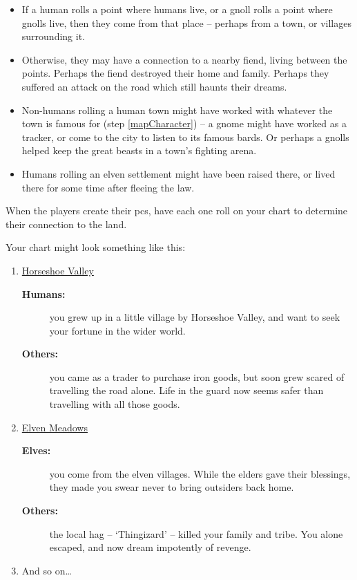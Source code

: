 \begin{multicols}{2}
\begin{itemize}
  \item
  If a human rolls a point where humans live, or a gnoll rolls a point where gnolls live, then they come from that place -- perhaps from a town, or villages surrounding it.
  \item
  Otherwise, they may have a connection to a nearby fiend, living between the points.
  Perhaps the fiend destroyed their home and family.
  Perhaps they suffered an attack on the road which still haunts their dreams.
  \item
  Non-humans rolling a human town might have worked with whatever the town is famous for (step \ref{mapCharacter}) -- a gnome might have worked as a tracker, or come to the city to listen to its famous bards.
  Or perhaps a gnolls helped keep the great beasts in a town's fighting arena.
  \item
  Humans rolling an elven settlement might have been raised there, or lived there for some time after fleeing the law.
\end{itemize}

When the players create their \glspl{pc}, have each one roll on your chart to determine their connection to the land.

\needspace{8em}
Your chart might look something like this:
\begin{enumerate}
  \item
  \underline{Horseshoe Valley}
  \begin{description}
    \item[\textbf{Humans:}] you grew up in a little village by Horseshoe Valley, and want to seek your fortune in the wider world.
    \item[\textbf{Others:}] you came as a trader to purchase iron goods, but soon grew scared of travelling the road alone.
    Life in the \gls{guard} now seems safer than travelling with all those goods.
  \end{description}
  \item
  \underline{Elven Meadows}
  \begin{description}
    \item[\textbf{Elves:}]
    you come from the elven villages.
    While the elders gave their blessings, they made you swear never to bring outsiders back home.
    \item[\textbf{Others:}]
    the local hag -- `Thingizard' -- killed your family and tribe.
    You alone escaped, and now dream impotently of revenge.
  \end{description}
  \item
  And so on\ldots
\end{enumerate}


\end{multicols}

